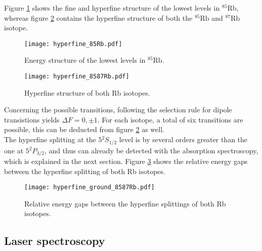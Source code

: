 Figure \ref{fig:hyperfine_85Rb} shows the fine and hyperfine structure of the lowest levels in $^{85}$Rb, whereas figure \ref{fig:hyperfine_8587Rb} contains the hyperfine structure of both the $^{85}\text{Rb}$ and $^{87}\text{Rb}$ isotope.
\begin{figure}[h]
	\centering
	\texttt{[image: hyperfine\_85Rb.pdf]}
	\caption{Energy structure of the lowest levels in $^{85}\text{Rb}$. \cite{lit:SAS}}
	\label{fig:hyperfine_85Rb}
\end{figure}
\begin{figure}[h]
	\centering
	\texttt{[image: hyperfine\_8587Rb.pdf]}
	\caption{Hyperfine structure of both Rb isotopes. \cite{lit:AK_manual2012}}
	\label{fig:hyperfine_8587Rb}
\end{figure}
Concerning the possible transitions, following the selection rule for dipole transistions yields $\Delta F=0,\pm 1$. For each isotope, a total of six transitions are possible, this can be deducted from figure \ref{fig:hyperfine_8587Rb} as well.\\
The hyperfine splitting at the $5{}^2S_{1/2}$ level is by several orders greater than the one at $5{}^2P_{3/2}$, and thus can already be detected with the absorption spectroscopy, which is explained in the next section. Figure \ref{fig:hyperfine_ground_8587Rb} shows the relative energy gaps between the hyperfine splitting of both Rb isotopes.
\begin{figure}[h]
	\centering
	\texttt{[image: hyperfine\_ground\_8587Rb.pdf]}
	\caption{Relative energy gaps between the hyperfine splittings of both Rb isotopes. \cite{lit:AK_manual2012}}
	\label{fig:hyperfine_ground_8587Rb}
\end{figure}
\subsection{Laser spectroscopy}
